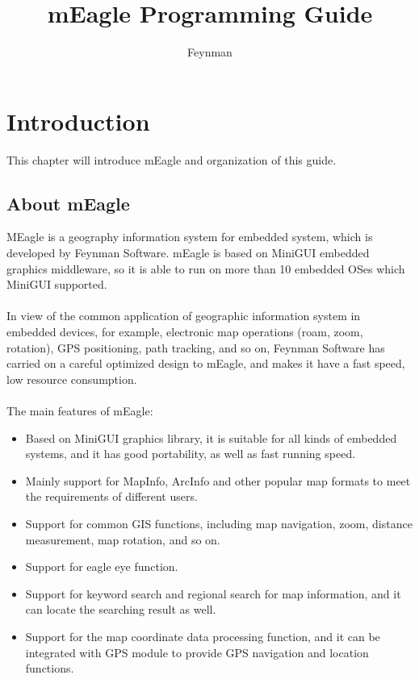 \documentclass[a4paper]{article}
\title{mEagle Programming Guide}
\author{Feynman}
\begin{document}
\pagestyle{fancy}
\lhead{}
\rhead{}

\maketitle

\newpage

\tableofcontents

\newpage


\section{Introduction}
This chapter will introduce mEagle and organization of this guide. 
\subsection{About mEagle}
MEagle is a geography information system for embedded system, which is developed by Feynman Software. mEagle is based on MiniGUI embedded graphics middleware, so it is able to run on more than 10 embedded OSes which MiniGUI supported.\\ \\
In view of the common application of geographic information system in embedded devices, for example, electronic map operations (roam, zoom, rotation), GPS positioning, path tracking, and so on, Feynman Software has carried on a careful optimized design to mEagle, and makes it have a fast speed, low resource consumption. \\ \\
The main features of mEagle: 
\begin{itemize}
\item Based on MiniGUI graphics library, it is suitable for all kinds of embedded systems, and it has good portability, as well as fast running speed.
\item Mainly support for MapInfo, ArcInfo and other popular map formats to meet the requirements of different users.
\item Support for common GIS functions, including map navigation, zoom, distance measurement, map rotation, and so on.
\item Support for eagle eye function. 
\item Support for keyword search and regional search for map information, and it can locate the searching result as well. 
\item Support for the map coordinate data processing function, and it can be integrated with GPS module to provide GPS navigation and location functions.
\end{itemize}
 
\end{document}
